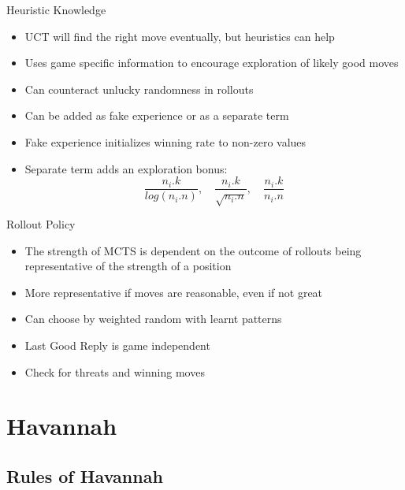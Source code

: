 \documentclass{beamer} %
\begin{document}
\begin{frame}{Heuristic Knowledge}
\begin{itemize}
	\item UCT will find the right move eventually, but heuristics can help
	\item Uses game specific information to encourage exploration of likely good moves
	\item Can counteract unlucky randomness in rollouts
	\item Can be added as fake experience or as a separate term
	\item Fake experience initializes winning rate to non-zero values
	\item Separate term adds an exploration bonus: $$\frac{n_i.k}{log(n_i.n)}, \quad \frac{n_i.k}{\sqrt{n_i.n}}, \quad \frac{n_i.k}{n_i.n}$$
\end{itemize}
\end{frame}


\begin{frame}{Rollout Policy}
\begin{itemize}
	\item The strength of MCTS is dependent on the outcome of rollouts being representative of the strength of a position
	\item More representative if moves are reasonable, even if not great
	\item Can choose by weighted random with learnt patterns
	\item Last Good Reply is game independent
	\item Check for threats and winning moves
\end{itemize}
\end{frame}




\section{Havannah}

\subsection{Rules of Havannah}
\end{document}
